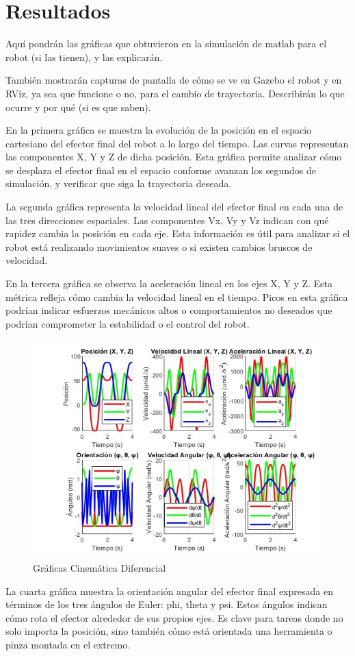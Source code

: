 \chapter{Resultados} \label{chap:resultados}
Aquí pondrán las gráficas que obtuvieron en la simulación de matlab para el robot (si las tienen), y las explicarán.

También mostrarán capturas de pantalla de cómo se ve en Gazebo el robot y en RViz, ya sea que funcione o no, para el cambio de trayectoria. Describirán lo que ocurre y por qué (si es que saben).

En la primera gráfica se muestra la evolución de la posición en el espacio cartesiano del efector final del robot a lo largo del tiempo. Las curvas representan las componentes X, Y y Z de dicha posición. Esta gráfica permite analizar cómo se desplaza el efector final en el espacio conforme avanzan los segundos de simulación, y verificar que siga la trayectoria deseada.

La segunda gráfica representa la velocidad lineal del efector final en cada una de las tres direcciones espaciales. Las componentes Vx, Vy y Vz indican con qué rapidez cambia la posición en cada eje. Esta información es útil para analizar si el robot está realizando movimientos suaves o si existen cambios bruscos de velocidad.

En la tercera gráfica se observa la aceleración lineal en los ejes X, Y y Z. Esta métrica refleja cómo cambia la velocidad lineal en el tiempo. Picos en esta gráfica podrían indicar esfuerzos mecánicos altos o comportamientos no deseados que podrían comprometer la estabilidad o el control del robot.


\begin{figure}
	\centering
	\includegraphics[width=0.5
	\linewidth]{img/cinematicadiferencial}
	\caption{Gráficas Cinemática Diferencial}
	\label{fig:cinematicadiferencial}
\end{figure}

La cuarta gráfica muestra la orientación angular del efector final expresada en términos de los tres ángulos de Euler: phi, theta y psi. Estos ángulos indican cómo rota el efector alrededor de sus propios ejes. Es clave para tareas donde no solo importa la posición, sino también cómo está orientada una herramienta o pinza montada en el extremo.

